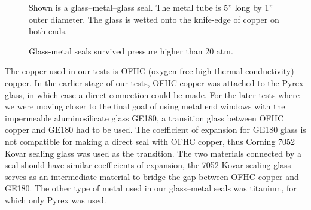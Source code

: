 \begin{figure}[t!]
	\centering
	\caption{{Shown is a glass--metal--glass seal. The metal tube is 5'' long by 1'' outer diameter. The glass is wetted onto the knife-edge of copper on both ends.}}
	\label{metal_tube}
\end{figure}

\begin{figure}[t!]
	\centering
	\caption{{Glass-metal seals survived pressure higher than 20 atm.}}
	\label{pressure_test}
\end{figure}

The copper used in our tests is OFHC (oxygen-free high thermal conductivity) copper. In the earlier stage of our tests, OFHC copper was attached to the Pyrex glass, in which case a direct connection could be made. For the later tests where we were moving closer to the final goal of using metal end windows with the impermeable aluminosilicate glass GE180, a transition glass between OFHC copper and GE180 had to be used. The coefficient of expansion for GE180 glass is not compatible for making a direct seal with OFHC copper, thus Corning 7052 Kovar sealing glass was used as the transition. The two materials connected by a seal should have similar coefficients of expansion, the 7052 Kovar sealing glass serves as an intermediate material to bridge the gap between OFHC copper and GE180. The other type of metal used in our glass--metal seals was titanium, for which only Pyrex was used.

